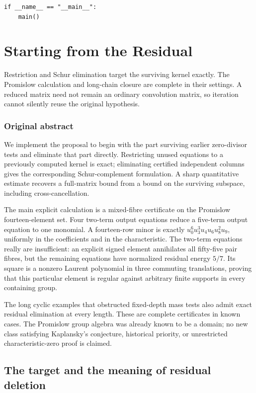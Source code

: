 \documentclass[11pt,a4paper,oneside]{report}
\theoremstyle{definition}
\theoremstyle{remark}
\newcommand{\compilationnote}[1]{\medskip\noindent{\small\color{accent}\textbf{Compilation note --- 23 November 2026.}}\par
{\small #1}\par\medskip}
\begin{document}
\begin{lstlisting}
if __name__ == "__main__":
    main()
\end{lstlisting}


\chapter{Starting from the Residual}\label{chap:M06}
\par
\compilationnote{Restriction and Schur elimination target the surviving kernel
exactly. The Promislow calculation and long-chain closure are complete in
their settings. A reduced matrix need not remain an ordinary convolution
matrix, so iteration cannot silently reuse the original hypothesis.}
\subsection*{Original abstract}
We implement the proposal to begin with the part surviving earlier
zero-divisor tests and eliminate that part directly. Restricting unused
equations to a previously computed kernel is exact; eliminating certified
independent columns gives the corresponding Schur-complement formulation.
A sharp quantitative estimate recovers a full-matrix bound from a bound
on the surviving subspace, including cross-cancellation.

The main explicit calculation is a mixed-fibre certificate on the
Promislow fourteen-element set. Four two-term output equations reduce
a five-term output equation to one monomial. A fourteen-row minor is
exactly $u_0^6u_3^3u_4u_6u_8^2u_9$, uniformly in the coefficients and in
the characteristic. The two-term equations really are insufficient:
an explicit signed element annihilates all fifty-five pair fibres,
but the remaining equations have normalized residual energy $5/7$.
Its square is a nonzero Laurent polynomial in three commuting
translations, proving that this particular element is regular against
arbitrary finite supports in every containing group.

The long cyclic examples that obstructed fixed-depth mass tests also
admit exact residual elimination at every length. These are complete
certificates in known cases. The Promislow group algebra was already
known to be a domain; no new class satisfying Kaplansky's conjecture,
historical priority, or unrestricted characteristic-zero proof is claimed.
\medskip
\section{The target and the meaning of residual deletion}
\end{document}
